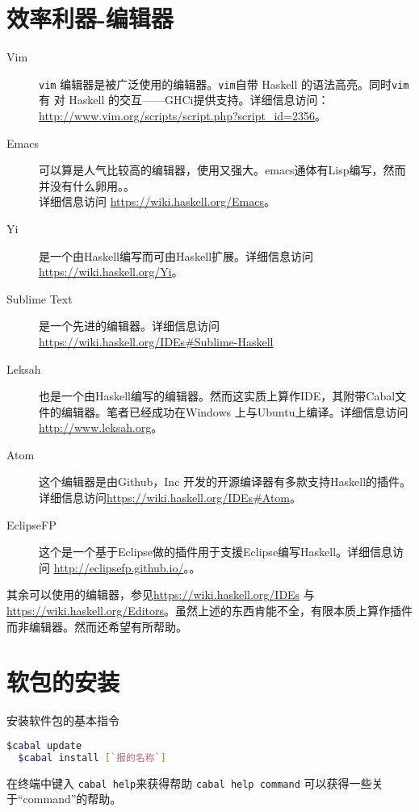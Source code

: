 \section{效率利器-编辑器}
\begin{description}
  \item[Vim]\verb"vim" 编辑器是被广泛使用的编辑器。\verb"vim"自带 Haskell 的语法高亮。同时\verb"vim" 有 对 Haskell 的交互——GHCi提供支持。详细信息访问： \url{http://www.vim.org/scripts/script.php?script_id=2356}。
  \item[Emacs] 可以算是人气比较高的编辑器，使用又强大。emacs通体有Lisp编写，然而并没有什么卵用。。\\ 详细信息访问
  \url{https://wiki.haskell.org/Emacs}。
  \item[Yi]是一个由Haskell编写而可由Haskell扩展。详细信息访问 \url{https://wiki.haskell.org/Yi}。
  \item[Sublime Text]  是一个先进的编辑器。详细信息访问\url{https://wiki.haskell.org/IDEs#Sublime-Haskell}
  \item[Leksah] 也是一个由Haskell编写的编辑器。然而这实质上算作IDE，其附带Cabal文件的编辑器。笔者已经成功在Windows 上与Ubuntu上编译。详细信息访问\url{http://www.leksah.org}。
  \item[Atom] 这个编辑器是由Github，Inc 开发的开源编译器有多款支持Haskell的插件。详细信息访问\url{https://wiki.haskell.org/IDEs#Atom}。
  \item[EclipseFP] 这个是一个基于Eclipse做的插件用于支援Eclipse编写Haskell。详细信息访问 \url{http://eclipsefp.github.io/}。。
\end{description}
其余可以使用的编辑器，参见\url{https://wiki.haskell.org/IDEs} 与 \url{https://wiki.haskell.org/Editors}。虽然上述的东西肯能不全，有限本质上算作插件而非编辑器。然而还希望有所帮助。
\section{软包的安装}
安装软件包的基本指令
\begin{lstlisting}[language=bash]
  $cabal update
  $cabal install [`报的名称`]
\end{lstlisting}

在终端中键入 \lstinline[language=bash]{cabal help}来获得帮助 \lstinline[language=bash]{cabal help command} 可以获得一些关于“command”的帮助。
